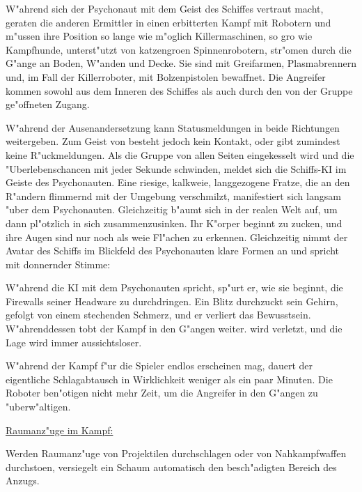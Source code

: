 W"ahrend sich der Psychonaut mit dem Geist des Schiffes vertraut macht, geraten die anderen Ermittler in einen erbitterten Kampf mit Robotern und m"ussen ihre Position so lange wie m"oglich Killermaschinen, so gro\3 wie Kampfhunde, unterst"utzt von katzengro\3en Spinnenrobotern, str"omen durch die G"ange an Boden, W"anden und Decke. Sie sind mit Greifarmen, Plasmabrennern und, im Fall der Killerroboter, mit Bolzenpistolen bewaffnet. Die Angreifer kommen sowohl aus dem Inneren des Schiffes als auch durch den von der Gruppe ge"offneten Zugang. 

W"ahrend der Ausenandersetzung kann \ml{} Statusmeldungen in beide Richtungen weitergeben. Zum Geist von \xl{} besteht jedoch kein Kontakt, oder \ml{} gibt zumindest keine R"uckmeldungen. Als die Gruppe von allen Seiten eingekesselt wird und die "Uberlebenschancen mit jeder Sekunde schwinden, meldet sich die Schiffs-KI im Geiste des Psychonauten. Eine riesige, kalkwei\3e, langgezogene Fratze, die an den R"andern flimmernd mit der Umgebung verschmilzt, manifestiert sich langsam "uber dem Psychonauten. Gleichzeitig b"aumt sich \xl{} in der realen Welt auf, um dann pl"otzlich in sich zusammenzusinken. Ihr K"orper beginnt zu zucken, und ihre Augen sind nur noch als wei\3e Fl"achen zu erkennen. Gleichzeitig nimmt der Avatar des Schiffs im Blickfeld des Psychonauten klare Formen an und spricht mit donnernder Stimme:


W"ahrend die KI mit dem Psychonauten spricht, sp"urt er, wie sie beginnt, die Firewalls seiner Headware zu durchdringen. Ein Blitz durchzuckt sein Gehirn, gefolgt von einem stechenden Schmerz, und er verliert das Bewusstsein. W"ahrenddessen tobt der Kampf in den G"angen weiter. \ml{} wird verletzt, und die Lage wird immer aussichtsloser.

\begin{remarks}
    W"ahrend der Kampf f"ur die Spieler endlos erscheinen mag, dauert der eigentliche Schlagabtausch in Wirklichkeit weniger als ein paar Minuten. Die Roboter ben"otigen nicht mehr Zeit, um die Angreifer in den G"angen zu "uberw"altigen.

    \underline{Raumanz"uge im Kampf:}

    Werden Raumanz"uge von Projektilen durchschlagen oder von Nahkampfwaffen durchsto\3en, versiegelt ein Schaum automatisch den besch"adigten Bereich des Anzugs.
\end{remarks}    
